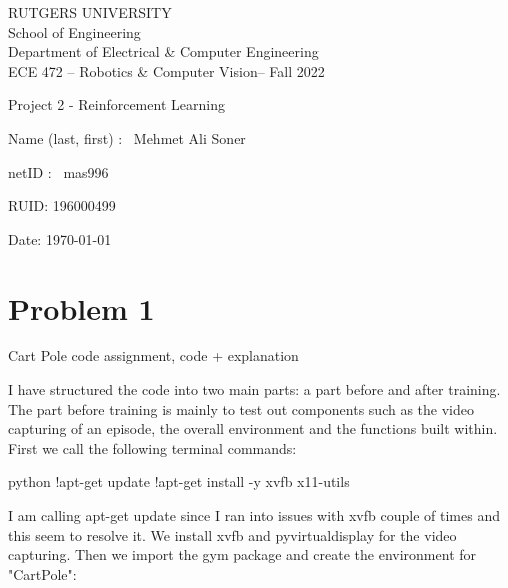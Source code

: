 \documentclass{article}
\numberwithin{equation}{section}
\numberwithin{equation}{section}
\def\ce{\begin{center}}
\def\cend{\end{center}}
\def\red{\color{red}}
\def\blue{\color{blue}}
\begin{document}
\ce
\red\Large
RUTGERS UNIVERSITY \\[0.05in]
School of Engineering \\[0.05in]
Department of Electrical \& Computer Engineering \\[0.2in]
\blue ECE 472 -- Robotics \& Computer Vision-- Fall 2022
\cend

\vspace{1in}

\huge \blue 

\begin{center}
Project 2 - Reinforcement Learning
\end{center}

\vspace{1in}

\Large

Name (last, first) : \ Mehmet Ali Soner 

\vspace{0.3in}

netID : \ mas996

\vspace{0.3in}

RUID:  196000499

\vspace{0.3in}

Date: \today




\vspace{1in}

\color{black} \normalsize


\newpage




\section{Problem 1}
Cart Pole code assignment, code + explanation


I have structured the code into two main parts: a part before and after training. The part before training is mainly to test out components such as the video capturing of an episode, the overall environment and the functions built within. First we call the following terminal commands:

\begin{mintedbox}{python}
!apt-get update
!apt-get install -y xvfb x11-utils
\end{mintedbox}

I am calling apt-get update since I ran into issues with xvfb couple of times and this seem to resolve it. We install xvfb and pyvirtualdisplay for the video capturing. Then we import the gym package and create the environment for "CartPole":
\end{document}
